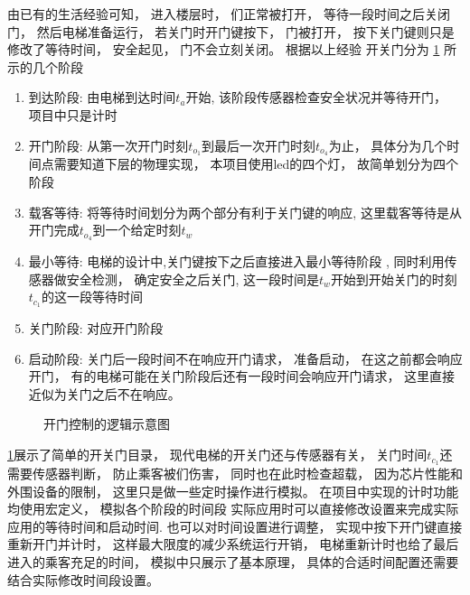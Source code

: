 \documentclass[../main.tex]{subfiles} %
\begin{document}
由已有的生活经验可知，
进入楼层时，
们正常被打开，
等待一段时间之后关闭门，
然后电梯准备运行，
若关门时开门键按下，
门被打开，
按下关门键则只是修改了等待时间，
安全起见，
门不会立刻关闭。
根据以上经验
开关门分为%
\cref{fig:door_control}
所示的几个阶段
\begin{enumerate}
  \item 到达阶段:
    由电梯到达时间$t_a$开始,
    该阶段传感器检查安全状况并等待开门，
    项目中只是计时
  \item 开门阶段:
    从第一次开门时刻$t_{o_1}$到最后一次开门时刻$t_{o_4}$为止，
    具体分为几个时间点需要知道下层的物理实现，
    本项目使用led的四个灯，
    故简单划分为四个阶段
  \item 载客等待:
    将等待时间划分为两个部分有利于关门键的响应,
    这里载客等待是从开门完成$t_{o_4}$到一个给定时刻$t_w$
  \item 最小等待:
    电梯的设计中,关门键按下之后直接进入最小等待阶段
    ,
    同时利用传感器做安全检测，
    确定安全之后关门,
    这一段时间是$t_w$开始到开始关门的时刻$t_{c_1}$的这一段等待时间
  \item 关门阶段:
    对应开门阶段
  \item 启动阶段:
    关门后一段时间不在响应开门请求，
    准备启动，
    在这之前都会响应开门，
    有的电梯可能在关门阶段后还有一段时间会响应开门请求，
    这里直接近似为关门之后不在响应。
\end{enumerate}

\begin{figure}[H]
  \centering
  \def\svgwidth{\linewidth}
  
  \caption{开门控制的逻辑示意图}
  \label{fig:door_control}
\end{figure}

\cref{fig:door_control}展示了简单的开关门目录，
现代电梯的开关门还与传感器有关，
关门时间$t_{c_1}$还需要传感器判断，
防止乘客被们伤害，
同时也在此时检查超载，
因为芯片性能和外围设备的限制，
这里只是做一些定时操作进行模拟。
在项目中实现的计时功能均使用宏定义，
模拟各个阶段的时间段
实际应用时可以直接修改设置来完成实际应用的等待时间和启动时间.
也可以对时间设置进行调整，
实现中按下开门键直接重新开门并计时，
这样最大限度的减少系统运行开销，
电梯重新计时也给了最后进入的乘客充足的时间，
模拟中只展示了基本原理，
具体的合适时间配置还需要结合实际修改时间段设置。
\end{document}
